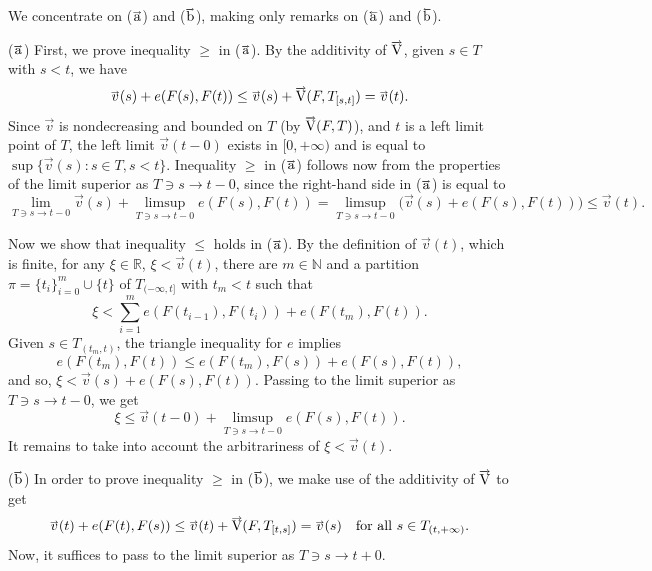 \documentclass[preprint,12pt]{elsarticle}
\newcommand{\Rb}{\mathbb{R}}  \newcommand{\Nb}{\mathbb{N}}
\newcommand{\riV}{{\scriptstyle\overrightarrow{\mbox{\rm V}}}}
\newcommand{\ori}[1]{{\scriptscriptstyle\overrightarrow{\mbox{$#1$}}}}
\newcommand{\ole}[1]{{\scriptscriptstyle\overleftarrow{\mbox{$#1$}}}}
\begin{document}
\begin{pf}
We concentrate on ($\ori{\mbox{\rm a}}$) and ($\ori{\mbox{\rm b}}$),
making only remarks on ($\ole{\mbox{\rm a}}$) and ($\ole{\mbox{\rm b}}$).

($\ori{\mbox{\rm a}}$)
First, we prove inequality $\ge$ in ($\ori{\mbox{\rm a}}$).
By the additivity of $\riV$, given $s\in T$ with $s<t$, we have
  \begin{equation*}
\ori{v}(s)+e(F(s),F(t))\le\ori{v}(s)+\riV(F,T_{[s,t]})=\ori{v}(t).
  \end{equation*}
Since $\ori{v}$ is nondecreasing and bounded on $T$ (by $\riV(F,T)$), and $t$ is a left
limit point of $T$, the left limit $\ori{v}(t-0)$ exists in $[0,+\infty)$ and is equal to
$\sup\{\ori{v}(s):s\in T,s<t\}$. Inequality $\ge$ in ($\ori{\mbox{\rm a}}$) follows
now from the properties of the limit superior as $T\!\ni\! s\!\to\! t\!-\!0$, since
the right-hand side in ($\ori{\mbox{\rm a}}$) is equal to
  \begin{equation*}
\lim_{T\ni s\to t-0}\!\ori{v}(s)\!+\!\limsup_{T\ni s\to t-0}\!e(F(s),F(t))\!=\!
\limsup_{T\ni s\to t-0}\!\bigl(\ori{v}(s)\!+\!e(F(s),F(t))\bigr)\le\ori{v}(t).
  \end{equation*}

Now we show that inequality $\le$ holds in ($\ori{\mbox{\rm a}}$). By the definition
of $\ori{v}(t)$, which is finite, for any $\xi\in\Rb$, $\xi<\ori{v}(t)$, there are $m\in\Nb$
and a partition $\pi=\{t_i\}_{i=0}^m\cup\{t\}$ of $T_{(-\infty,t]}$ with $t_m<t$
such that
  \begin{equation*}
\xi<\sum_{i=1}^m e(F(t_{i-1}),F(t_i))+e(F(t_m),F(t)).
  \end{equation*}
Given $s\in T_{(t_m,t)}$, the triangle inequality for $e$ implies
  \begin{equation*}
e(F(t_m),F(t))\le e(F(t_m),F(s))+e(F(s),F(t)),
  \end{equation*}
and so, $\xi<\ori{v}(s)+e(F(s),F(t))$. Passing to the limit superior as
$T\ni s\to t-0$, we get
  \begin{equation*}
\xi\le\ori{v}(t-0)+\limsup_{T\ni s\to t-0}e(F(s),F(t)).
  \end{equation*}
It remains to take into account the arbitrariness of $\xi<\ori{v}(t)$.

\smallbreak
($\ori{\mbox{\rm b}}$)
In order to prove inequality $\ge$ in ($\ori{\mbox{\rm b}}$), we make use of the
additivity of $\riV$ to get
  \begin{equation*}
\ori{v}(t)+e(F(t),F(s))\le\ori{v}(t)+\riV(F,T_{[t,s]})=\ori{v}(s)\quad
\mbox{for all $s\in T_{(t,+\infty)}$.}
  \end{equation*}
Now, it suffices to pass to the limit superior as $T\ni  s\to t+0$.


\end{pf}
\end{document}
